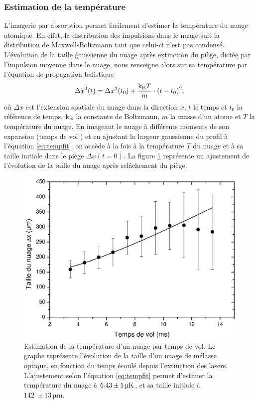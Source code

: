 \subsubsection*{Estimation de la température}
\noindent L'imagerie par absorption permet facilement d'estimer la température du nuage atomique.
En effet, la distribution des impulsions dans le nuage suit la distribution de Maxwell-Boltzmann tant que celui-ci n'est pas condensé.
L'évolution de la taille gaussienne du nuage après extinction du piège, dictée par l'impulsion moyenne dans le nuage,  nous renseigne alors sur sa température par l'équation de propagation balistique
\begin{equation}
\label{eq:tempfit}
\Delta x^2 (t) = \Delta x^2(t_0) + \frac{\mathrm{k_B} T}{m} \cdot (t-t_0)^2,
\end{equation}
où $\Delta x$ est l'extension spatiale du nuage dans la direction $x$, $t$ le temps et $t_0$ la référence de temps, $\mathrm{k_B}$ la constante de Boltzmann, $m$ la masse d'un atome et $T$ la température du nuage.
En imageant le nuage à différents moments de son expansion (\og temps de vol \fg{}) et en ajustant la largeur gaussienne du profil à l'équation \eqref{eq:tempfit}, on accède à la fois à la température $T$ du nuage et à sa taille initiale dans le piège $\Delta x(t=0)$.
La figure \ref{fig:Tempfit} représente un ajustement de l'évolution de la taille du nuage après relâchement du piège.
%
\begin{figure}[!h]
\centering
\includegraphics[width=.6\linewidth]{figures/setup/coldatoms/Tempfit}
\caption[Estimation de la température d'un nuage par temps de vol]{
Estimation de la température d'un nuage par temps de vol.
Le graphe représente l'évolution de la taille d'un nuage de mélasse optique, en fonction du temps écoulé depuis l'extinction des lasers.
L'ajustement selon l'équation \eqref{eq:tempfit} permet d'estimer la température du nuage à $\SI{6.43}{} \pm\SI{1}{\si{\micro\kelvin}}$, et sa taille initiale à $\SI{142}{} \pm \SI{13}{\um}$.
}
\label{fig:Tempfit}
\end{figure}
	
